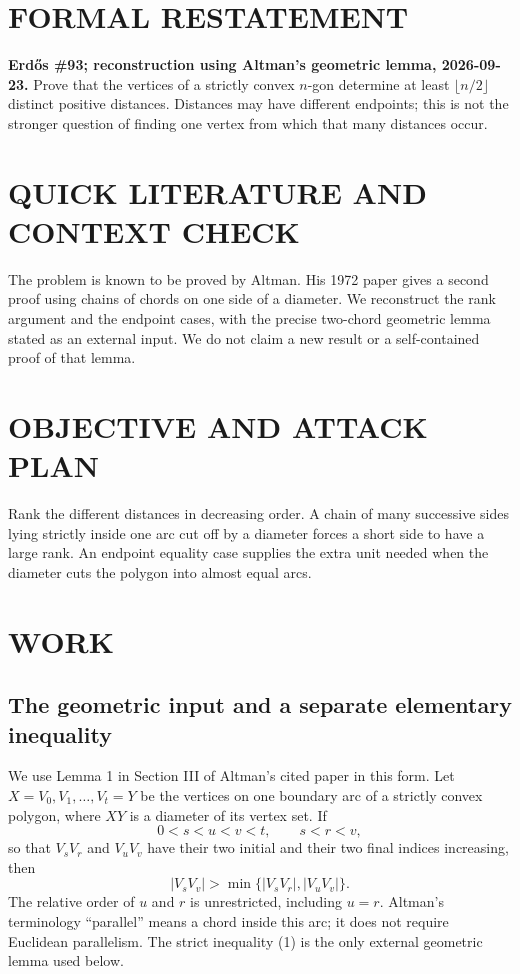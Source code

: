 \section{FORMAL RESTATEMENT}
\textbf{Erd\H{o}s \#93; reconstruction using Altman's geometric lemma, 2026-09-23.}
Prove that the vertices of a strictly convex $n$-gon determine at least $\lfloor n/2\rfloor$ distinct positive distances. Distances may have different endpoints; this is not the stronger question of finding one vertex from which that many distances occur.

\section{QUICK LITERATURE AND CONTEXT CHECK}
The problem is known to be proved by Altman. His 1972 paper gives a second proof using chains of chords on one side of a diameter. We reconstruct the rank argument and the endpoint cases, with the precise two-chord geometric lemma stated as an external input. We do not claim a new result or a self-contained proof of that lemma.

\section{OBJECTIVE AND ATTACK PLAN}
Rank the different distances in decreasing order. A chain of many successive sides lying strictly inside one arc cut off by a diameter forces a short side to have a large rank. An endpoint equality case supplies the extra unit needed when the diameter cuts the polygon into almost equal arcs.

\section{WORK}
\subsection{The geometric input and a separate elementary inequality}
We use Lemma 1 in Section III of Altman's cited paper in this form. Let $X=V_0,V_1,\ldots,V_t=Y$ be the vertices on one boundary arc of a strictly convex polygon, where $XY$ is a diameter of its vertex set. If
\[
0<s<u<v<t,\qquad s<r<v,
\]
so that $V_sV_r$ and $V_uV_v$ have their two initial and their two final indices increasing, then
\[
|V_sV_v|>\min\{|V_sV_r|,|V_uV_v|\}.
\tag{1}
\]
The relative order of $u$ and $r$ is unrestricted, including $u=r$. Altman's terminology ``parallel'' means a chord inside this arc; it does not require Euclidean parallelism. The strict inequality (1) is the only external geometric lemma used below.

